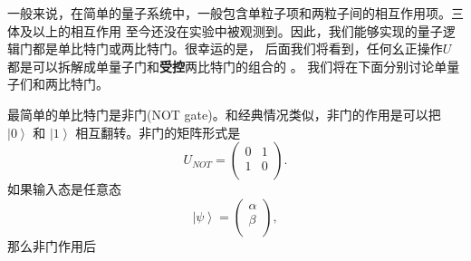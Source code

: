  一般来说，在简单的量子系统中，一般包含单粒子项和两粒子间的相互作用项。三体及以上的相互作用
 至今还没在实验中被观测到。因此，我们能够实现的量子逻辑门都是单比特门或两比特门。很幸运的是，
 后面我们将看到，任何幺正操作$U$都是可以拆解成单量子门和\textbf{受控}两比特门的组合的 \cite{Deutsch2,DiVincenzo2,Lloyd2,DBE}。 我们将在下面分别讨论单量子们和两比特门。

 最简单的单比特门是非门(NOT gate)。和经典情况类似，非门的作用是可以把 $\left\vert 0\right\rangle$ 和 $\left\vert 1\right\rangle$ 相互翻转。非门的矩阵形式是
     \begin{equation}
       U_{NOT} = \left(
                   \begin{array}{cc}
                     0 & 1 \\
                     1 & 0 \\
                   \end{array}
                 \right).
 \end{equation}
 如果输入态是任意态
  \begin{equation}
       \left\vert \psi\right\rangle =\left(
                                                                       \begin{array}{c}
                                                                         \alpha \\
                                                                         \beta \\
                                                                       \end{array}
                                                                     \right),
 \end{equation}
 那么非门作用后
